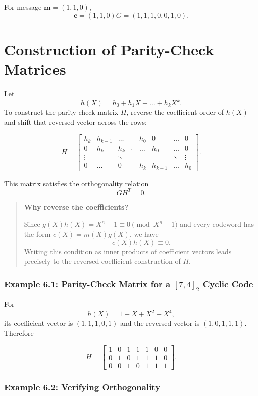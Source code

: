 \documentclass[11pt,oneside]{book}
\theoremstyle{plain}
\theoremstyle{definition}
\theoremstyle{remark}
\begin{document}
For message \(\mathbf{m}=(1,1,0)\),
\[\mathbf{c}=(1,1,0)G=(1,1,1,0,0,1,0).\]


\section{Construction of Parity-Check Matrices}\label{sec:parity-check-matrices}

Let \[h(X)=h_0+h_1X+\dots+h_kX^k.\] To construct the parity-check matrix
\(H\), reverse the coefficient order of \(h(X)\) and shift that reversed
vector across the rows:

\[H = \begin{bmatrix}
h_k & h_{k-1} & \dots & h_0 & 0 & \dots & 0 \\
0 & h_k & h_{k-1} & \dots & h_0 & \dots & 0 \\
\vdots & & \ddots & & & \ddots & \vdots \\
0 & \dots & 0 & h_k & h_{k-1} & \dots & h_0
\end{bmatrix}.\]

This matrix satisfies the orthogonality relation \[GH^T=0.\]

\begin{quote}
\textbf{Why reverse the coefficients?}

Since \(g(X)h(X)=X^n-1 \equiv 0 \pmod{X^n-1}\) and every codeword has
the form \(c(X)=m(X)g(X)\), we have \[c(X)h(X) \equiv 0.\] Writing this
condition as inner products of coefficient vectors leads precisely to
the reversed-coefficient construction of \(H\).
\end{quote}

\subsubsection{\texorpdfstring{Example 6.1: Parity-Check Matrix for a
\([7,4]_2\) Cyclic
Code}{Example 6.1: Parity-Check Matrix for a {[}7,4{]}\_2 Cyclic Code}}\label{example-6.1-parity-check-matrix-for-a-74_2-cyclic-code}

For \[h(X)=1+X+X^2+X^4,\] its coefficient vector is \((1,1,1,0,1)\) and
the reversed vector is \((1,0,1,1,1)\). Therefore

\[H = \begin{bmatrix}
1 & 0 & 1 & 1 & 1 & 0 & 0 \\
0 & 1 & 0 & 1 & 1 & 1 & 0 \\
0 & 0 & 1 & 0 & 1 & 1 & 1
\end{bmatrix}.\]

\subsubsection{Example 6.2: Verifying
Orthogonality}\label{example-6.2-verifying-orthogonality}
\end{document}
